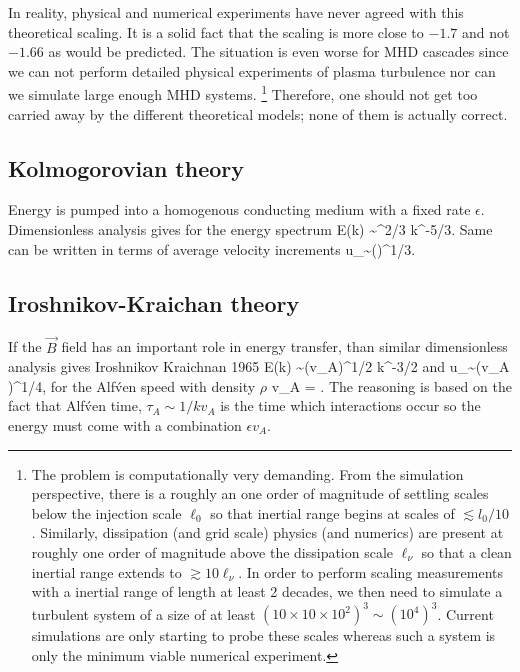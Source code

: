 \documentclass[usenatbib,twocolumn]{aastex63}
\begin{document}
In reality, physical and numerical experiments have never agreed with this theoretical scaling.
It is a solid fact that the scaling is more close to $-1.7$  and not $-1.66$ as would be predicted.
The situation is even worse for MHD cascades since we can not perform detailed physical experiments of plasma turbulence nor can we simulate large enough MHD systems.%
\footnote{
    The problem is computationally very demanding.
From the simulation perspective, there is a roughly an one order of magnitude of settling scales below the injection scale $\ell_0$ so that inertial range begins at scales of $\lesssim l_0/10$.
Similarly, dissipation (and grid scale) physics (and numerics) are present at roughly one order of magnitude above the dissipation scale $\ell_\nu$ so that a clean inertial range extends to $\gtrsim 10 \ell_\nu$.
In order to perform scaling measurements with a inertial range of length at least 2 decades, we then need to simulate a turbulent system of a size of at least $(10\times10\times10^2)^3 \sim (10^4)^3$.
Current simulations are only starting to probe these scales whereas such a system is only the minimum viable numerical experiment.
}
Therefore, one should not get too carried away by the different theoretical models;
none of them is actually correct.


\subsection{Kolmogorovian theory}\label{sect:K41}

Energy is pumped into a homogenous conducting medium with a fixed rate $\epsilon$.
Dimensionless analysis gives for the energy spectrum \citep{Kolmogov_1941}
\be
E(k) \sim \epsilon^{2/3} k^{-5/3}.
\ee
Same can be written in terms of average velocity increments
\be
\delta u_\lambda \sim (\epsilon \lambda)^{1/3}.
\ee

\subsection{Iroshnikov-Kraichan theory}\label{sect:K65}

If the $\vec{B}$ field has an important role in energy transfer, than similar dimensionless analysis gives Iroshnikov Kraichnan 1965
\be
E(k) \sim (\epsilon v_A)^{1/2} k^{-3/2}
\ee
and
\be
\delta u_\lambda \sim (\epsilon v_A \lambda)^{1/4},
\ee
for the Alf\'ven speed with density $\rho$
\be
v_A = .
\ee
The reasoning is based on the fact that Alf\'ven time, $\tau_A \sim 1/k v_A$ is the time which interactions occur so the energy must come with a combination $\epsilon v_A$.
\end{document}
